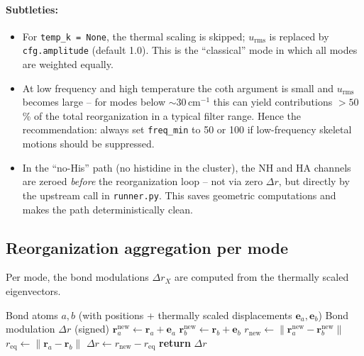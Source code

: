 \documentclass[11pt,a4paper,twoside]{article}
\theoremstyle{remark}
\begin{document}
\paragraph{Subtleties:}
\begin{itemize}\setlength{\itemsep}{0pt}
  \item For \texttt{temp\_k = None}, the thermal scaling is
        skipped; $u_\text{rms}$ is replaced by
        \texttt{cfg.amplitude} (default 1.0). This is the
        ``classical'' mode in which all modes are weighted equally.
  \item At low frequency and high temperature the coth argument
        is small and $u_\text{rms}$ becomes large -- for modes
        below $\sim 30$\,cm$^{-1}$ this can yield contributions
        $> 50$\,\% of the total reorganization in a typical filter
        range. Hence the recommendation: always set
        \texttt{freq\_min} to 50 or 100 if low-frequency skeletal
        motions should be suppressed.
  \item In the ``no-His'' path (no histidine in the cluster), the
        NH and HA channels are zeroed \emph{before} the
        reorganization loop -- not via zero $\Delta r$, but
        directly by the upstream call in \texttt{runner.py}. This
        saves geometric computations and makes the path
        deterministically clean.
\end{itemize}

\subsection{Reorganization aggregation per mode}
\label{app:pseudo-reorg}

Per mode, the bond modulations $\Delta r_X$ are computed from the
thermally scaled eigenvectors.

\begin{algorithm}[H]
\caption{\textsc{ComputeBondModulation} (FeFe example)}
\begin{algorithmic}[1]
\Require Bond atoms $a, b$ (with positions + thermally scaled
         displacements $\mathbf{e}_a, \mathbf{e}_b$)
\Ensure Bond modulation $\Delta r$ (signed)
\State $\mathbf{r}_a^\text{new} \gets \mathbf{r}_a + \mathbf{e}_a$
\State $\mathbf{r}_b^\text{new} \gets \mathbf{r}_b + \mathbf{e}_b$
\State $r_\text{new} \gets \|\mathbf{r}_a^\text{new} - \mathbf{r}_b^\text{new}\|$
\State $r_\text{eq} \gets \|\mathbf{r}_a - \mathbf{r}_b\|$
\State $\Delta r \gets r_\text{new} - r_\text{eq}$
\State \textbf{return} $\Delta r$
\end{algorithmic}
\end{algorithm}
\end{document}
